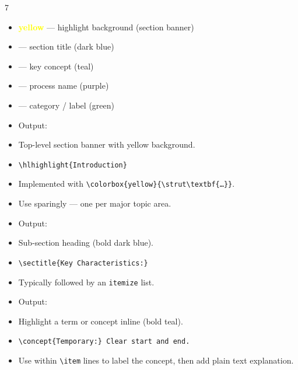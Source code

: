 \documentclass[a4paper,landscape]{article}
\begin{document}
\begin{multicols}{7}

\begin{itemize}
\item \textcolor{yellow}{\textbf{yellow}} — highlight background (section banner)
\item {} — section title (dark blue)
\item {} — key concept (teal)
\item {} — process name (purple)
\item {} — category / label (green)
\end{itemize}

\begin{itemize}
\item Output: 
\item {} Top-level section banner with yellow background.
\item {} \texttt{\textbackslash hlhighlight\{Introduction\}}
\item Implemented with \texttt{\textbackslash colorbox\{yellow\}\{\textbackslash strut\textbackslash textbf\{…\}\}}.
\item Use sparingly — one per major topic area.
\end{itemize}

\begin{itemize}
\item Output: 
\item {} Sub-section heading (bold dark blue).
\item {} \texttt{\textbackslash sectitle\{Key Characteristics:\}}
\item Typically followed by an \texttt{itemize} list.
\end{itemize}

\begin{itemize}
\item Output: 
\item {} Highlight a term or concept inline (bold teal).
\item {} \texttt{\textbackslash concept\{Temporary:\} Clear start and end.}
\item Use within \texttt{\textbackslash item} lines to label the concept, then add plain text explanation.
\end{itemize}


\end{multicols}
\end{document}
